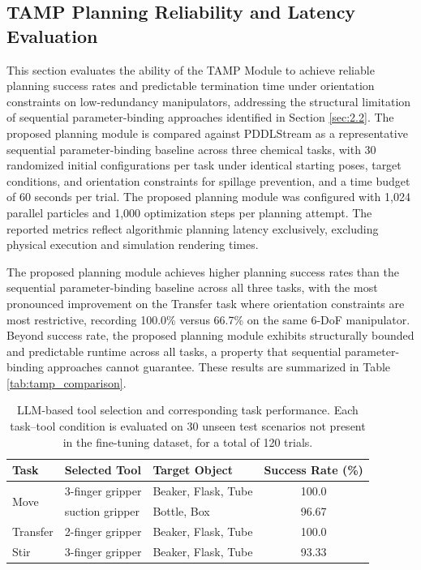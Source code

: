 \documentclass{ieeeaccess}
\begin{document}
\subsection{TAMP Planning Reliability and Latency Evaluation}\label{sec:4.3}
This section evaluates the ability of the TAMP Module to achieve reliable planning success rates and predictable termination time under orientation constraints on low-redundancy manipulators, addressing the structural limitation of sequential parameter-binding approaches identified in Section \ref{sec:2.2}. The proposed planning module is compared against PDDLStream as a representative sequential parameter-binding baseline across three chemical tasks, with 30 randomized initial configurations per task under identical starting poses, target conditions, and orientation constraints for spillage prevention, and a time budget of 60 seconds per trial. The proposed planning module was configured with 1,024 parallel particles and 1,000 optimization steps per planning attempt. The reported metrics reflect algorithmic planning latency exclusively, excluding physical execution and simulation rendering times.

The proposed planning module achieves higher planning success rates than the sequential parameter-binding baseline across all three tasks, with the most pronounced improvement on the Transfer task where orientation constraints are most restrictive, recording 100.0\% versus 66.7\% on the same 6-DoF manipulator. Beyond success rate, the proposed planning module exhibits structurally bounded and predictable runtime across all tasks, a property that sequential parameter-binding approaches cannot guarantee. These results are summarized in Table \ref{tab:tamp_comparison}.


\begin{table}[t]
\centering
\caption{LLM-based tool selection and corresponding task performance. Each task--tool condition is evaluated on 30 unseen test scenarios not present in the fine-tuning dataset, for a total of 120 trials.}
\label{tab:tool_selection}
\begin{tabular*}{\linewidth}{@{\extracolsep{\fill}}lllc@{}}
\toprule
\textbf{Task} & \textbf{Selected Tool} & \textbf{Target Object} & \textbf{Success Rate (\%)} \\ \midrule
\multirow{2}{*}{Move} & 3-finger gripper & Beaker, Flask, Tube & 100.0 \\
 & suction gripper & Bottle, Box & 96.67 \\ \midrule
Transfer & 2-finger gripper & Beaker, Flask, Tube & 100.0 \\ \midrule
Stir & 3-finger gripper & Beaker, Flask, Tube & 93.33 \\ \bottomrule
\end{tabular*}
\end{table}
\end{document}
